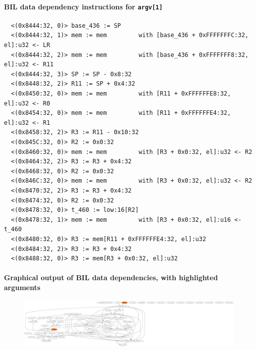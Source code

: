 \documentclass[letterpaper,11pt]{article}
\begin{document}
\paragraph{BIL data dependency instructions for \texttt{argv[1]}}

\begin{verbatim}
  <(0x8444:32, 0)> base_436 := SP
  <(0x8444:32, 1)> mem := mem         with [base_436 + 0xFFFFFFFC:32, el]:u32 <- LR
  <(0x8444:32, 2)> mem := mem         with [base_436 + 0xFFFFFFF8:32, el]:u32 <- R11
  <(0x8444:32, 3)> SP := SP - 0x8:32
  <(0x8448:32, 2)> R11 := SP + 0x4:32
  <(0x8450:32, 0)> mem := mem         with [R11 + 0xFFFFFFE8:32, el]:u32 <- R0
  <(0x8454:32, 0)> mem := mem         with [R11 + 0xFFFFFFE4:32, el]:u32 <- R1
  <(0x8458:32, 2)> R3 := R11 - 0x10:32
  <(0x845C:32, 0)> R2 := 0x0:32
  <(0x8460:32, 0)> mem := mem         with [R3 + 0x0:32, el]:u32 <- R2
  <(0x8464:32, 2)> R3 := R3 + 0x4:32
  <(0x8468:32, 0)> R2 := 0x0:32
  <(0x846C:32, 0)> mem := mem         with [R3 + 0x0:32, el]:u32 <- R2
  <(0x8470:32, 2)> R3 := R3 + 0x4:32
  <(0x8474:32, 0)> R2 := 0x0:32
  <(0x8478:32, 0)> t_460 := low:16[R2]
  <(0x8478:32, 1)> mem := mem         with [R3 + 0x0:32, el]:u16 <- t_460
  <(0x8480:32, 0)> R3 := mem[R11 + 0xFFFFFFE4:32, el]:u32
  <(0x8484:32, 2)> R3 := R3 + 0x4:32
  <(0x8488:32, 0)> R3 := mem[R3 + 0x0:32, el]:u32
\end{verbatim}

\paragraph{Graphical output of BIL data dependencies, with highlighted arguments}

\begin{figure}[ht!]
\centering
\includegraphics[scale=0.15, trim=0mm 0mm 780mm 0mm, clip]{img/ddep.pdf}
\end{figure}

\nocite{*}
{
}
\end{document}
